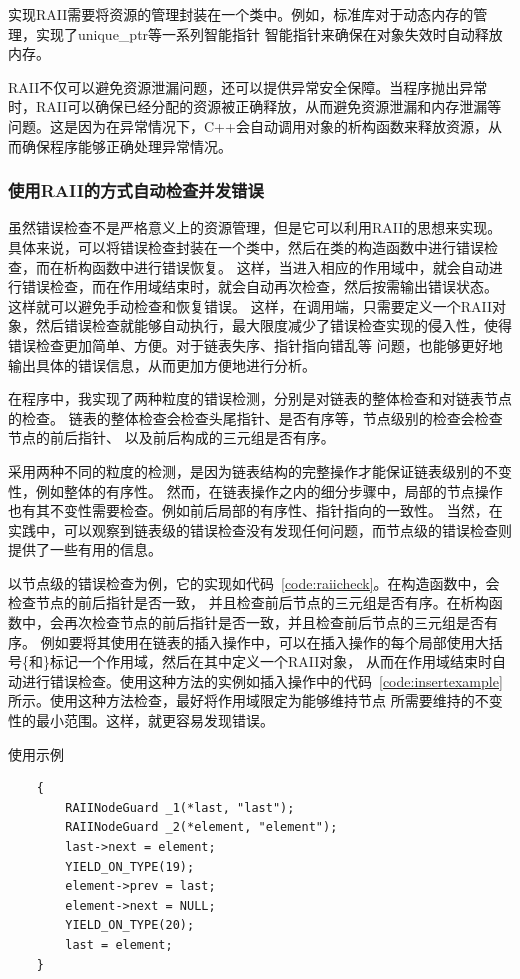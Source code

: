 \documentclass[a4paper,twoside]{article}
\begin{document}
\begin{spacing}{1.2}
实现RAII需要将资源的管理封装在一个类中。例如，标准库对于动态内存的管理，实现了unique\_ptr等一系列智能指针
智能指针来确保在对象失效时自动释放内存。

RAII不仅可以避免资源泄漏问题，还可以提供异常安全保障。当程序抛出异常时，RAII可以确保已经分配的资源被正确释放，从而避免资源泄漏和内存泄漏等问题。这是因为在异常情况下，C++会自动调用对象的析构函数来释放资源，从而确保程序能够正确处理异常情况。

\subsubsection{使用RAII的方式自动检查并发错误}

虽然错误检查不是严格意义上的资源管理，但是它可以利用RAII的思想来实现。具体来说，可以将错误检查封装在一个类中，然后在类的构造函数中进行错误检查，而在析构函数中进行错误恢复。
这样，当进入相应的作用域中，就会自动进行错误检查，而在作用域结束时，就会自动再次检查，然后按需输出错误状态。
这样就可以避免手动检查和恢复错误。
这样，在调用端，只需要定义一个RAII对象，然后错误检查就能够自动执行，最大限度减少了错误检查实现的侵入性，使得错误检查更加简单、方便。对于链表失序、指针指向错乱等
问题，也能够更好地输出具体的错误信息，从而更加方便地进行分析。

在程序中，我实现了两种粒度的错误检测，分别是对链表的整体检查和对链表节点的检查。
链表的整体检查会检查头尾指针、是否有序等，节点级别的检查会检查节点的前后指针、
以及前后构成的三元组是否有序。

采用两种不同的粒度的检测，是因为链表结构的完整操作才能保证链表级别的不变性，例如整体的有序性。
然而，在链表操作之内的细分步骤中，局部的节点操作也有其不变性需要检查。例如前后局部的有序性、指针指向的一致性。
当然，在实践中，可以观察到链表级的错误检查没有发现任何问题，而节点级的错误检查则提供了一些有用的信息。

以节点级的错误检查为例，它的实现如代码~\ref{code:raiicheck}。在构造函数中，会检查节点的前后指针是否一致，
并且检查前后节点的三元组是否有序。在析构函数中，会再次检查节点的前后指针是否一致，并且检查前后节点的三元组是否有序。
例如要将其使用在链表的插入操作中，可以在插入操作的每个局部使用大括号\{和\}标记一个作用域，然后在其中定义一个RAII对象，
从而在作用域结束时自动进行错误检查。使用这种方法的实例如插入操作中的代码~\ref{code:insertexample}所示。使用这种方法检查，最好将作用域限定为能够维持节点
所需要维持的不变性的最小范围。这样，就更容易发现错误。
\begin{listing}[H]
	\caption{使用示例}
	\label{code:insertexample}
	\begin{verbatim}
	{
		RAIINodeGuard _1(*last, "last");
		RAIINodeGuard _2(*element, "element");
		last->next = element;
		YIELD_ON_TYPE(19);
		element->prev = last;
		element->next = NULL;
		YIELD_ON_TYPE(20);
		last = element;
	}
	\end{verbatim}
\end{listing}


\end{spacing}
\end{document}
